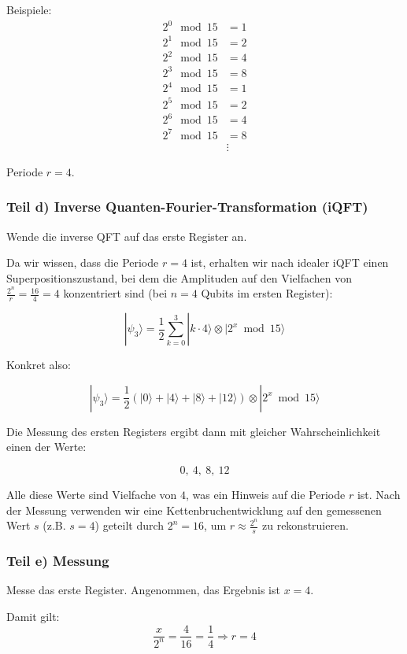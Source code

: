 Beispiele:
\begin{align*}
2^0 \mod 15 &= 1 \\
2^1 \mod 15 &= 2 \\
2^2 \mod 15 &= 4 \\
2^3 \mod 15 &= 8 \\
2^4 \mod 15 &= 1 \\
2^5 \mod 15 &= 2 \\
2^6 \mod 15 &= 4 \\
2^7 \mod 15 &= 8 \\
&\vdots
\end{align*}

Periode \( r = 4 \).

\subsubsection*{Teil d) Inverse Quanten-Fourier-Transformation (iQFT)}
Wende die inverse QFT auf das erste Register an.

Da wir wissen, dass die Periode $r = 4$ ist, erhalten wir nach idealer iQFT einen Superpositionszustand, bei dem die Amplituden auf den Vielfachen von $\frac{2^n}{r} = \frac{16}{4} = 4$ konzentriert sind (bei $n = 4$ Qubits im ersten Register):

\[
|\psi_3\rangle = \frac{1}{2} \sum_{k=0}^{3} |k \cdot 4\rangle \otimes |2^x \bmod 15\rangle
\]

Konkret also:

\[
|\psi_3\rangle = \frac{1}{2}\left( |0\rangle + |4\rangle + |8\rangle + |12\rangle \right) \otimes |2^x \bmod 15\rangle
\]

Die Messung des ersten Registers ergibt dann mit gleicher Wahrscheinlichkeit einen der Werte:

\[
\boxed{0,\ 4,\ 8,\ 12}
\]

Alle diese Werte sind Vielfache von $4$, was ein Hinweis auf die Periode $r$ ist. Nach der Messung verwenden wir eine Kettenbruchentwicklung auf den gemessenen Wert $s$ (z.B. $s = 4$) geteilt durch $2^n = 16$, um $r \approx \frac{2^n}{s}$ zu rekonstruieren.

\subsubsection*{Teil e) Messung}
Messe das erste Register. Angenommen, das Ergebnis ist \( x = 4 \).

Damit gilt:
\[
\frac{x}{2^n} = \frac{4}{16} = \frac{1}{4} \Rightarrow r = 4
\]

